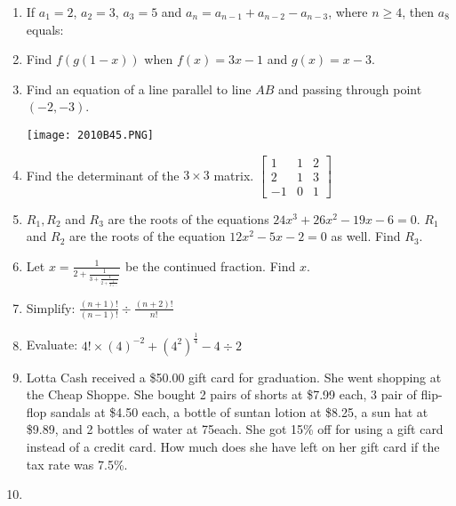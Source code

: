 \documentclass[../uilmath.tex]{subfiles}
\begin{document}
\begin{enumerate}[label=\bfseries\arabic*.]
        \item %
        If $a_1=2$, $a_2=3$, $a_3=5$ and $a_n=a_{n-1}+a_{n-2}-a_{n-3}$, where $n\geq 4$, then $a_8$ equals:

        \item %
        Find $f(g(1-x))$ when $f(x)=3x-1$ and $g(x)=x-3$.

        \item %
        Find an equation of a line parallel to line $AB$ and passing through point $(-2,-3)$.
        \begin{center}
            \texttt{[image: 2010B45.PNG]}
        \end{center}

        \item %
        Find the determinant of the $3\times 3$ matrix.
        $\begin{bmatrix}
            1 & 1 & 2 \\
            2 & 1 & 3 \\
            -1 & 0 & 1
        \end{bmatrix}$

        \item %
        $R_1, R_2$ and $R_3$ are the roots of the equations $24x^3+26x^2-19x-6=0$. $R_1$ and $R_2$ are the roots of the equation 
        $12x^2-5x-2=0$ as well. Find $R_3$.

        \item %
        Let $x=\frac{1}{2+\frac{1}{3+\frac{1}{2+\frac{1}{3+\dots}}}}$ be the continued fraction. Find $x$.

        \item %
        Simplify: $\frac{(n+1)!}{(n-1)!}\div \frac{(n+2)!}{n!}$

        \item %
        Evaluate: $4!\times (4)^{-2}+(4^2)^{\frac{1}{4}}-4\div 2$

        \item %
        Lotta Cash received a \$50.00 gift card for graduation. She went shopping at the Cheap Shoppe. She bought 2 pairs of shorts at \$7.99 each, 3 pair of flip-flop 
        sandals at \$4.50 each, a bottle of suntan lotion at \$8.25, a sun hat at \$9.89, and 2 bottles of water at 75\textcent  each. She got 15\% off for using a gift card 
        instead of a credit card. How much does she have left on her gift card if the tax rate was 7.5\%.
        
        \item %
        
\end{enumerate}
\end{document}
